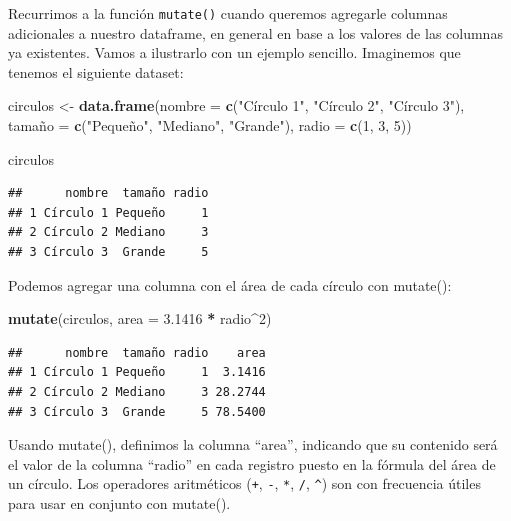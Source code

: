 \documentclass[spanish,]{book}
\newenvironment{Shaded}{\begin{snugshade}}{\end{snugshade}}
\newcommand{\DataTypeTok}[1]{\textcolor[rgb]{0.13,0.29,0.53}{#1}}
\newcommand{\DecValTok}[1]{\textcolor[rgb]{0.00,0.00,0.81}{#1}}
\newcommand{\FloatTok}[1]{\textcolor[rgb]{0.00,0.00,0.81}{#1}}
\newcommand{\KeywordTok}[1]{\textcolor[rgb]{0.13,0.29,0.53}{\textbf{#1}}}
\newcommand{\NormalTok}[1]{#1}
\newcommand{\OperatorTok}[1]{\textcolor[rgb]{0.81,0.36,0.00}{\textbf{#1}}}
\newcommand{\StringTok}[1]{\textcolor[rgb]{0.31,0.60,0.02}{#1}}
\begin{document}
Recurrimos a la función \texttt{mutate()} cuando queremos agregarle columnas adicionales a nuestro dataframe, en general en base a los valores de las columnas ya existentes. Vamos a ilustrarlo con un ejemplo sencillo. Imaginemos que tenemos el siguiente dataset:

\begin{Shaded}
\begin{Highlighting}[]
\NormalTok{circulos <-}\StringTok{ }\KeywordTok{data.frame}\NormalTok{(}\DataTypeTok{nombre =} \KeywordTok{c}\NormalTok{(}\StringTok{"Círculo 1"}\NormalTok{, }\StringTok{"Círculo 2"}\NormalTok{, }\StringTok{"Círculo 3"}\NormalTok{),}
\NormalTok{                       tamañ}\DataTypeTok{o =} \KeywordTok{c}\NormalTok{(}\StringTok{"Pequeño"}\NormalTok{, }\StringTok{"Mediano"}\NormalTok{, }\StringTok{"Grande"}\NormalTok{),}
                       \DataTypeTok{radio  =} \KeywordTok{c}\NormalTok{(}\DecValTok{1}\NormalTok{, }\DecValTok{3}\NormalTok{, }\DecValTok{5}\NormalTok{))}

\NormalTok{circulos}
\end{Highlighting}
\end{Shaded}

\begin{verbatim}
##      nombre  tamaño radio
## 1 Círculo 1 Pequeño     1
## 2 Círculo 2 Mediano     3
## 3 Círculo 3  Grande     5
\end{verbatim}

Podemos agregar una columna con el área de cada círculo con mutate():

\begin{Shaded}
\begin{Highlighting}[]
\KeywordTok{mutate}\NormalTok{(circulos, }\DataTypeTok{area =} \FloatTok{3.1416} \OperatorTok{*}\StringTok{ }\NormalTok{radio}\OperatorTok{^}\DecValTok{2}\NormalTok{)}
\end{Highlighting}
\end{Shaded}

\begin{verbatim}
##      nombre  tamaño radio    area
## 1 Círculo 1 Pequeño     1  3.1416
## 2 Círculo 2 Mediano     3 28.2744
## 3 Círculo 3  Grande     5 78.5400
\end{verbatim}

Usando mutate(), definimos la columna ``area'', indicando que su contenido será el valor de la columna ``radio'' en cada registro puesto en la fórmula del área de un círculo. Los operadores aritméticos (\texttt{+}, \texttt{-}, \texttt{*}, \texttt{/}, \texttt{\^{}}) son con frecuencia útiles para usar en conjunto con mutate().
\end{document}
